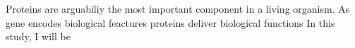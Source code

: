 Proteins are arguabiliy the most important component in a living organism. As gene encodes biological feactures proteins deliver biological functions   In this study, I will be 